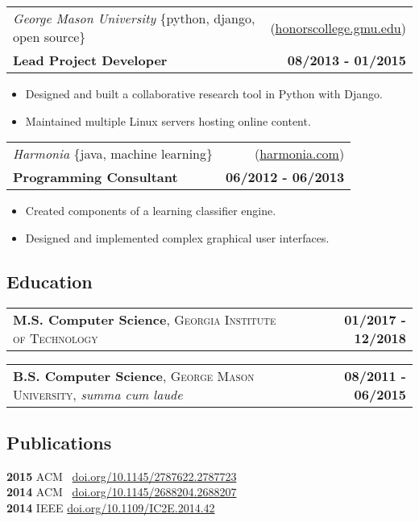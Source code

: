 \documentclass[10pt,letterpaper]{article}
\begin{document}
\vspace{0.25cm}

\noindent\begin{tabularx}{\textwidth}{@{} Xr @{}}
  \textit{George Mason University} \{python, django, open source\} & (\href{https://honorscollege.gmu.edu}{honorscollege.gmu.edu}) \\
  \textbf{Lead Project Developer} & \textbf{08/2013 - 01/2015}
\end{tabularx}

\begin{itemize}
\item Designed and built a collaborative research tool in Python with Django.
\item Maintained multiple Linux servers hosting online content.
\end{itemize}

\vspace{0.25cm}

\noindent\begin{tabularx}{\textwidth}{@{} Xr @{}}
  \textit{Harmonia} \{java, machine learning\} & (\href{https://harmonia.com}{harmonia.com}) \\
  \textbf{Programming Consultant} & \textbf{06/2012 - 06/2013}
\end{tabularx}

\begin{itemize}
\item Created components of a learning classifier engine.
\item Designed and implemented complex graphical user interfaces.
\end{itemize}

\subsection{Education}

\noindent
\begin{tabularx}{\textwidth}{@{} Xr @{}}
  \textbf{M.S. Computer Science}, \textsc{Georgia Institute of Technology} & \textbf{01/2017 - 12/2018}
\end{tabularx}

\noindent
\begin{tabularx}{\textwidth}{@{} Xr @{}}
  \textbf{B.S. Computer Science}, \textsc{George Mason University}, \emph{summa cum laude} & \textbf{08/2011 - 06/2015}
\end{tabularx}

\subsection{Publications}

\noindent
\textbf{2015} ACM \ \href{https://doi.org/10.1145/2787622.2787723}{doi.org/10.1145/2787622.2787723} \\
\textbf{2014} ACM \ \href{https://doi.org/10.1145/2688204.2688207}{doi.org/10.1145/2688204.2688207} \\
\textbf{2014} IEEE  \href{https://doi.org/10.1109/IC2E.2014.42}{doi.org/10.1109/IC2E.2014.42}
\end{document}
